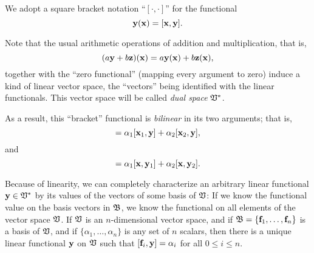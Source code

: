 We adopt a square bracket notation ``$[\cdot , \cdot ]$''
for the functional
\begin{equation}
{\bf y} ({\bf x})
=
[{\bf x},{\bf y}].
\end{equation}

Note that the usual arithmetic operations of addition and multiplication,
that is,
\begin{equation}
(a {\bf y} + b {\bf z}) ({\bf x})
=
a {\bf y} ({\bf x}) + b {\bf z} ({\bf x}) ,
\end{equation}
together with the ``zero functional''
(mapping every argument to zero)
induce a kind of linear vector space, the ``vectors''
being identified with the linear functionals.
This vector space will be called {\em dual space} ${\frak V}^\ast $.


As a result, this ``bracket'' functional is
{\em bilinear} in its two arguments; that is,
\begin{equation}
[ \alpha_1 {\bf x}_1 +\alpha_2 {\bf x}_2, {\bf y}]
=
\alpha_1 [{\bf x}_1 ,{\bf y}]  +\alpha_2  [{\bf x}_2,{\bf y}],
\end{equation}
and
\begin{equation}
[
{\bf x}, \alpha_1 {\bf y}_1 +\alpha_2 {\bf y}_2
]
=
\alpha_1
[{\bf x},{\bf y}_1 ]
+
\alpha_2
[{\bf x},{\bf y}_2].
\end{equation}


Because of linearity, we can completely characterize an arbitrary linear functional
${\bf y} \in {\frak V}^\ast $ by its values of the vectors of some basis of ${\frak V}$:
If we know the functional value on the basis vectors in ${\frak B}$, we know the functional
on all elements of the vector space ${\frak V}$.
If ${\frak V}$ is an $n$-dimensional vector space, and if ${\frak B} = \{{\bf f}_1,\ldots , {\bf f}_n\}$
is a basis of  ${\frak V}$, and if
$\{\alpha_1, \ldots ,\alpha_n\}$  is any set of $n$ scalars, then there is
a unique linear functional ${\bf y}$  on  ${\frak V}$ such that
$ [ {\bf f}_i, {\bf y}] = \alpha_i $ for all $0\le i \le n$.

